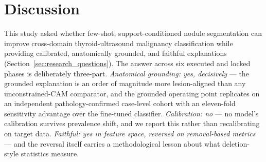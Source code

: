 \documentclass[jimh,article,submit,moreauthors,pdftex]{Definitions/tsp}
\begin{document}

\section{Discussion}\label{sec:discussion}

This study asked whether few-shot, support-conditioned nodule segmentation
can improve cross-domain thyroid-ultrasound malignancy classification while
providing calibrated, anatomically grounded, and faithful explanations
(Section~\ref{sec:research_questions}). The answer across six executed and
locked phases is deliberately three-part. \emph{Anatomical grounding: yes,
decisively} --- the grounded explanation is an order of magnitude more
lesion-aligned than any unconstrained-CAM comparator, and the grounded
operating point replicates on an independent pathology-confirmed case-level
cohort with an eleven-fold sensitivity advantage over the fine-tuned
classifier. \emph{Calibration: no} --- no model's calibration survives
prevalence shift, and we report this rather than recalibrating on target
data. \emph{Faithful: yes in feature space, reversed on removal-based
metrics} --- and the reversal itself carries a methodological lesson about
what deletion-style statistics measure.
\end{document}
